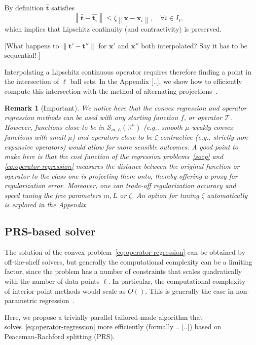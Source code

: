 \documentclass{article}
\newtheorem{remark}[theorem]{Remark}
\newcommand{\norm}[1]{\left\lVert#1\right\rVert}
\newcommand{\R}{\mathbb{R}}
\newcommand{\tv}{\mathbold{t}}
\newcommand{\x}{\mathbold{x}}
\newcommand{\andrea}[1]{{\color{red}[#1]}}
\begin{document}
By definition $\hat{\tv}$ satisfies
\begin{equation}
	\norm{\hat{\tv} - \hat{\tv_i}} \leq \zeta \norm{\x - \x_i}, \quad \forall i \in I_{\ell},
\end{equation}
which implies that Lipschitz continuity (and contractivity) is preserved.

\andrea{What happens to $\|\tv' - \tv''\|$ for $\x'$ and $\x''$ both interpolated? Say it has to be sequential! }


Interpolating a Lipschitz continuous operator requires therefore finding a point in the intersection of $\ell$ ball sets. In the Appendix [..], we show how to efficiently compute this intersection with the method of alternating projections~\cite{reich_projection_2015}.

\begin{remark}[Important] We notice here that the convex regression and operator regression methods can be used with any starting function $f$, or operator $\mathcal{T}$. However, functions close to be in $\mathcal{S}_{m,L}(\R^n)$ (e.g., smooth $\mu$-weakly convex functions with small $\mu$) and operators close to be $\zeta$-contractive (e.g., strictly non-expansive operators) would allow for more sensible outcomes. A good point to make here is that the cost function of the regression problems~\eqref{socp} and \eqref{eq:operator-regression} measures the distance between the original function or operator to the class one is projecting them onto, thereby offering a proxy for regularization error. Moreover, one can trade-off regularization accuracy and speed tuning the free parameters $m,L$ or $\zeta$. An option for tuning $\zeta$ automatically is explored in the Appendix.
\end{remark}

\subsection{PRS-based solver}

The solution of the convex problem~\eqref{eq:operator-regression} can be obtained by off-the-shelf solvers, but generally the computational complexity can be a limiting factor, since the problem has a number of constraints that scales quadratically with the number of data points $\ell$. In particular, the computational complexity of interior-point methods would scale as $O()$. This is generally the case in non-parametric regression~\cite{.}. 

Here, we propose a trivially parallel tailored-made algorithm that solves~\eqref{eq:operator-regression} more efficiently (formally .. [..]) based on Peaceman-Rachford splitting (PRS).   
\end{document}
